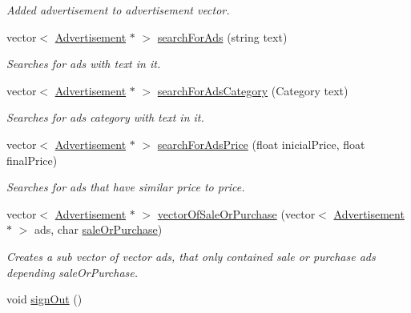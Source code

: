 \begin{DoxyCompactItemize}
\begin{DoxyCompactList}\small\item\em Added advertisement to advertisement vector. \end{DoxyCompactList}\item 
vector$<$ \hyperlink{class_advertisement}{Advertisement} $\ast$ $>$ \hyperlink{class_data_a2d154ed7f306a52f9881f28c8a05dd8d}{search\+For\+Ads} (string text)
\begin{DoxyCompactList}\small\item\em Searches for ads with text in it. \end{DoxyCompactList}\item 
vector$<$ \hyperlink{class_advertisement}{Advertisement} $\ast$ $>$ \hyperlink{class_data_a792520f278facffb963b239b8b684a15}{search\+For\+Ads\+Category} (Category text)
\begin{DoxyCompactList}\small\item\em Searches for ads category with text in it. \end{DoxyCompactList}\item 
vector$<$ \hyperlink{class_advertisement}{Advertisement} $\ast$ $>$ \hyperlink{class_data_a7f5f4489bd571f294b306547722d06ff}{search\+For\+Ads\+Price} (float inicial\+Price, float final\+Price)
\begin{DoxyCompactList}\small\item\em Searches for ads that have similar price to price. \end{DoxyCompactList}\item 
vector$<$ \hyperlink{class_advertisement}{Advertisement} $\ast$ $>$ \hyperlink{class_data_aa54b962f82cd79a35fbd916ffa36a301}{vector\+Of\+Sale\+Or\+Purchase} (vector$<$ \hyperlink{class_advertisement}{Advertisement} $\ast$ $>$ ads, char \hyperlink{menus_8h_ae86c9baed98a2c948118c65c7f6c7764}{sale\+Or\+Purchase})
\begin{DoxyCompactList}\small\item\em Creates a sub vector of vector ads, that only contained sale or purchase ads depending sale\+Or\+Purchase. \end{DoxyCompactList}\item 
\hypertarget{class_data_aa360a3db988286931e07793bcb179f81}{}void \hyperlink{class_data_aa360a3db988286931e07793bcb179f81}{sign\+Out} ()\label{class_data_aa360a3db988286931e07793bcb179f81}


\end{DoxyCompactItemize}
